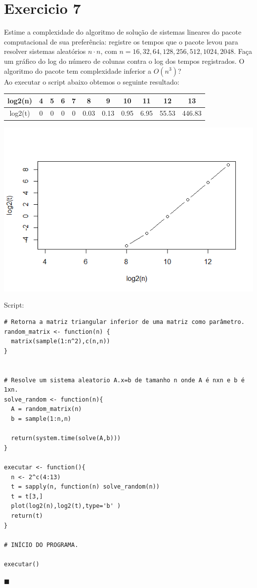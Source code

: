 \documentclass[12pt,a4paper]{article}
\newcommand{\qed}{\hfill $\blacksquare$}
\begin{document}
\newpage
\section*{Exercicio 7}
Estime a complexidade do algoritmo de solução de sistemas lineares do pacote computacional de sua
preferência: registre os tempos que o pacote levou para resolver sistemas aleatórios $ n \cdot n $, com $ n =
16,32,64,128,256,512,1024,2048 $. Faça um gráfico do log do número de colunas contra o log dos tempos
registrados. O algoritmo do pacote tem complexidade inferior a $ O(n^3) $?
\\

Ao executar o script abaixo obtemos o seguinte resultado:

\begin{tabular}{|c|c|c|c|c|c|c|c|c|c|c|}
\hline log2(n) & 4 & 5 & 6 & 7 & 8 & 9 & 10 & 11 & 12 & 13 \\ 
\hline log2(t) & 0 & 0 & 0 & 0 & 0.03 & 0.13 & 0.95 & 6.95 & 55.53 & 446.83\\ 
\hline 
\end{tabular} 

\includegraphics[width=0.8\linewidth]{./ex7}

Script:

\begin{verbatim}
# Retorna a matriz triangular inferior de uma matriz como parâmetro.
random_matrix <- function(n) {
  matrix(sample(1:n^2),c(n,n))
}


# Resolve um sistema aleatorio A.x=b de tamanho n onde A é nxn e b é 1xn.
solve_random <- function(n){
  A = random_matrix(n)
  b = sample(1:n,n)
  
  return(system.time(solve(A,b)))
}

executar <- function(){
  n <- 2^c(4:13)
  t = sapply(n, function(n) solve_random(n))
  t = t[3,]
  plot(log2(n),log2(t),type='b' )
  return(t)
}

# INÍCIO DO PROGRAMA.

executar()
\end{verbatim}
\qed
\end{document}
